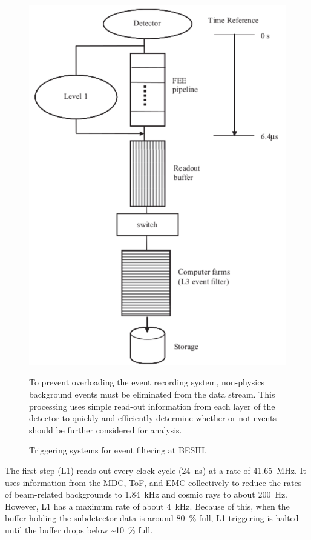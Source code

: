 \begin{figure}[H]
\centering
\includegraphics[scale=0.75]{figures/images/triggering.pdf}
\caption{Triggering systems for event filtering at BESIII.}
{To prevent overloading the event recording system, non-physics background events must be eliminated from the data stream.
This processing uses simple read-out information from each layer of the detector to quickly and efficiently determine whether or not events should be further considered for analysis.}
\label{fig:triggering}
\end{figure}

The first step (L1) reads out every clock cycle (\SI{24}{\ns}) at a rate of \SI{41.65}{\MHz}.
It uses information from the MDC, ToF, and EMC collectively to reduce the rates of beam-related backgrounds to \SI{1.84}{\kHz} and cosmic rays to about \SI{200}{\Hz}.
However, L1 has a maximum rate of about \SI{4}{\kHz}.
Because of this, when the buffer holding the subdetector data is around \SI{80}{\%} full, L1 triggering is halted until the buffer drops below \SI{~10}{\%} full.


